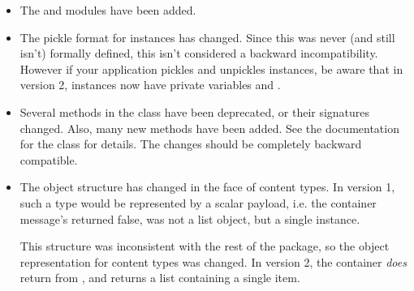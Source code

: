 \begin{itemize}
\item The  and  modules
      have been added.
\item The pickle format for  instances has changed.
      Since this was never (and still isn't) formally defined, this
      isn't considered a backward incompatibility.  However if your
      application pickles and unpickles  instances, be
      aware that in  version 2, 
      instances now have private variables  and
      .
\item Several methods in the  class have been
      deprecated, or their signatures changed.  Also, many new methods
      have been added.  See the documentation for the 
      class for details.  The changes should be completely backward
      compatible.
\item The object structure has changed in the face of
       content types.  In 
      version 1, such a type would be represented by a scalar payload,
      i.e. the container message's  returned
      false,  was not a list object, but a single
       instance.

      This structure was inconsistent with the rest of the package, so
      the object representation for  content
      types was changed.  In  version 2, the container
      \emph{does} return  from , and
       returns a list containing a single
       item.


\end{itemize}
